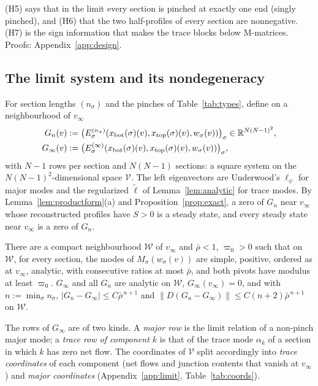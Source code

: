 \documentclass[11pt,a4paper]{report}
\newcommand{\cV}{\mathcal V}
\newcommand{\cW}{\mathcal W}
\newcommand{\xb}{x_{\mathrm{bot}}}
\newcommand{\xt}{x_{\mathrm{top}}}
\newcommand{\piv}{\varpi}
\begin{document}
(H5) says that in the limit every section is pinched at exactly one end (singly pinched), and (H6) that the two
half-profiles of every section are nonnegative. (H7) is the sign information that makes the trace blocks below M-matrices.
Proofs: Appendix~\ref{app:design}.

\subsection{The limit system and its nondegeneracy}\label{sec:limitsystem}

For section lengths \((n_\sigma)\) and the pinches of Table~\ref{tab:types}, define on a neighbourhood of \(v_\infty\)
\begin{equation}\label{eq:Gn}
\begin{aligned}
G_n(v)&:=\bigl(E^{(n_\sigma)}_\sigma(\xb(\sigma)(v),\xt(\sigma)(v),w_\sigma(v))\bigr)_\sigma\in\R^{N(N-1)^2},\\
G_\infty(v)&:=\bigl(E^{(\infty)}_\sigma(\xb(\sigma)(v),\xt(\sigma)(v),w_\sigma(v))\bigr)_\sigma ,
\end{aligned}
\end{equation}
with \(N-1\) rows per section and \(N(N-1)\) sections: a square system on the \(N(N-1)^2\)-dimensional space \(\cV\). The left
eigenvectors are Underwood's \(\ell_\psi\) for major modes and the regularized \(\tilde\ell\) of Lemma~\ref{lem:analytic} for trace
modes. By Lemma~\ref{lem:productform}(a) and Proposition~\ref{prop:exact}, a zero of \(G_n\) near \(v_\infty\) whose reconstructed
profiles have \(S>0\) is a steady state, and every steady state near \(v_\infty\) is a zero of \(G_n\).

\begin{lemma}[domain]\label{lem:domain}
There are a compact neighbourhood \(\cW\) of \(v_\infty\) and \(\bar\rho<1\), \(\piv_0>0\) such that on \(\cW\), for every section, the
modes of \(M_\sigma(w_\sigma(v))\) are simple, positive, ordered as at \(v_\infty\), analytic, with consecutive ratios at most \(\bar\rho\),
and both pivots have modulus at least \(\piv_0\). \(G_\infty\) and all \(G_n\) are analytic on \(\cW\), \(G_\infty(v_\infty)=0\), and with
\(n:=\min_\sigma n_\sigma\), \(|G_n-G_\infty|\le C\bar\rho^{\,n+1}\) and \(\|D(G_n-G_\infty)\|\le C(n+2)\bar\rho^{\,n+1}\) on \(\cW\).
\end{lemma}

The rows of \(G_\infty\) are of two kinds. A \emph{major row} is the limit relation of a non-pinch major mode; a \emph{trace row of
component \(k\)} is that of the trace mode \(\alpha_k\) of a section in which \(k\) has zero net flow. The coordinates of \(\cV\) split
accordingly into \emph{trace coordinates} of each component (net flows and junction contents that vanish at \(v_\infty\)) and
\emph{major coordinates} (Appendix~\ref{app:limit}, Table~\ref{tab:coords}).
\end{document}

